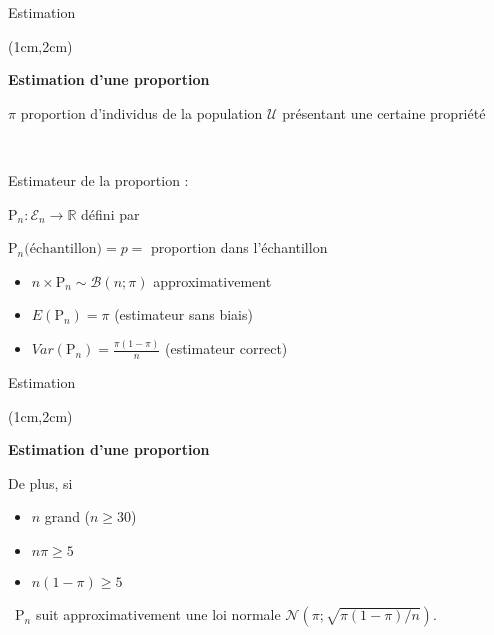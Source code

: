 \documentclass{beamer}
\newcommand{\R}{\mathbb{R}}
\newcommand{\pop}{\mathcal{U}} %
\begin{document}
\begin{frame}{Estimation}
\begin{textblock*}{\textwidth}(1cm,2cm)

\begin{center}{\bf \Large Estimation d'une proportion} \end{center}

 $\pi$  proportion d'individus de la population $\pop$ présentant une certaine propriété
 
 \

Estimateur de la proportion : \\
\begin{center}
$\mathrm{P}_n : \mathcal{E}_n \longrightarrow \R$ défini par 
\end{center}

\begin{center}
$\mathrm{P}_n\mbox{(échantillon)} =p=$ proportion dans l'échantillon 
\end{center}

 \begin{itemize}
 \item $n\times \mathrm{P}_n \sim \mathcal{B}(n;\pi)$ approximativement
 \item $E(\mathrm{P}_n)=\pi$ (estimateur sans biais)
 \item $Var(\mathrm{P}_n)=\frac{\pi(1-\pi)}{n}$ (estimateur correct)
 \end{itemize}


\end{textblock*}

\end{frame}



\begin{frame}{Estimation}
\begin{textblock*}{\textwidth}(1cm,2cm)

\begin{center}{\bf \Large Estimation d'une proportion} \end{center}

\vspace{0.5cm}
De plus, si
\begin{itemize}
\item $n$  grand ($n\geq 30$)
\item $n\pi\geq 5$
\item $n(1-\pi)\geq 5$
\end{itemize} 

\
 $\mathrm{P}_n$ suit approximativement une loi normale 
$\displaystyle \mathcal{N}\left(\pi;\sqrt{\pi(1-\pi)/n}\right)$.

\end{textblock*}

\end{frame}
\end{document}
